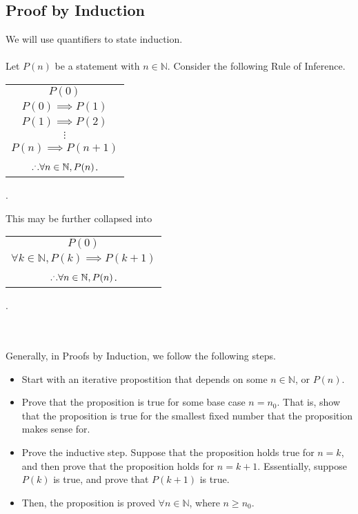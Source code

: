     \subsection{Proof by Induction}
    
        We will use quantifiers to state induction.
        \\
        \\
        Let \(P(n)\) be a statement with \(n\in\mathbb{N}\). Consider the following Rule of Inference.
        \begin{center}
            \begin{tabular}{c}
                \hline
                \(P(0)\) \\
                \(P(0) \implies P(1)\) \\
                \(P(1) \implies P(2)\) \\
                \(\vdots\) \\
                \(P(n) \implies P(n+1)\) \\
                \hline
                \(.^.. \forall n\in\mathbb{N}, P(n)\). \\
                \hline
            \end{tabular}.
        \end{center}
        This may be further collapsed into
        \begin{center}
            \begin{tabular}{c}
                \hline
                \(P(0)\) \\
                \(\forall k\in\mathbb{N}, P(k)\implies P(k+1)\) \\
                \hline
                \(.^.. \forall n\in\mathbb{N}, P(n)\). \\
                \hline
            \end{tabular}.
        \end{center}
        \vphantom
        \\
        \\
        Generally, in Proofs by Induction, we follow the following steps.
        \begin{itemize}
            \item Start with an iterative propostition that depends on some \(n\in\mathbb{N}\), or \(P(n)\).
            \item Prove that the proposition is true for some base case \(n=n_0\). That is, show that the proposition is true for the smallest fixed number that the proposition makes sense for.
            \item Prove the inductive step. Suppose that the proposition holds true for \(n=k\), and then prove that the proposition holds for \(n=k+1\). Essentially, suppose \(P(k)\) is true, and prove that \(P(k+1)\) is true.
            \item Then, the proposition is proved \(\forall n\in\mathbb{N}\), where \(n \geq n_0\).
        \end{itemize}
